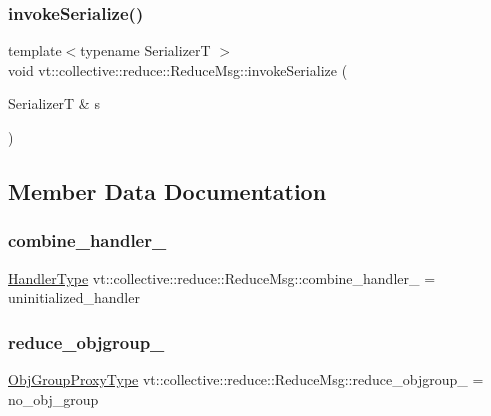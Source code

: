 \subsubsection{\texorpdfstring{invoke\+Serialize()}{invokeSerialize()}}
{\footnotesize\ttfamily template$<$typename SerializerT $>$ \\
void vt\+::collective\+::reduce\+::\+Reduce\+Msg\+::invoke\+Serialize (\begin{DoxyParamCaption}\item[{SerializerT \&}]{s }\end{DoxyParamCaption})\hspace{0.3cm}{\ttfamily [inline]}}



\subsection{Member Data Documentation}
\mbox{\label{structvt_1_1collective_1_1reduce_1_1_reduce_msg_a1265faa9b668a8668148a97f98b75d0d}} 
\subsubsection{\texorpdfstring{combine\+\_\+handler\+\_\+}{combine\_handler\_}}
{\footnotesize\ttfamily \hyperlink{namespacevt_af64846b57dfcaf104da3ef6967917573}{Handler\+Type} vt\+::collective\+::reduce\+::\+Reduce\+Msg\+::combine\+\_\+handler\+\_\+ = uninitialized\+\_\+handler}

\mbox{\label{structvt_1_1collective_1_1reduce_1_1_reduce_msg_a193a47361809085ee01211b288e8bb8a}} 
\subsubsection{\texorpdfstring{reduce\+\_\+objgroup\+\_\+}{reduce\_objgroup\_}}
{\footnotesize\ttfamily \hyperlink{namespacevt_ad7cae989df485fccca57f0792a880a8e}{Obj\+Group\+Proxy\+Type} vt\+::collective\+::reduce\+::\+Reduce\+Msg\+::reduce\+\_\+objgroup\+\_\+ = no\+\_\+obj\+\_\+group}

